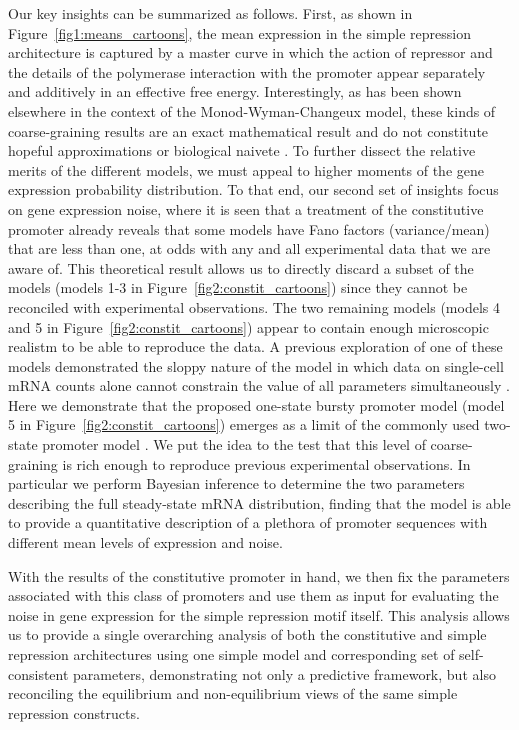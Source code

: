 Our key insights can be summarized as follows. First, as shown in 
Figure~\ref{fig1:means_cartoons}, the mean expression in the simple repression
architecture is captured by a master curve in which the action of repressor and
the details of the polymerase interaction with the promoter appear separately
and additively in an effective free energy. Interestingly, as has been shown
elsewhere in the context of the Monod-Wyman-Changeux model, these kinds of
coarse-graining results are an exact mathematical result and do not constitute
hopeful approximations or biological naivete \cite{Razo-Mejia2018, Chure2019}.
To further dissect the relative merits of the different models, we must appeal
to higher moments of the gene expression probability distribution. To that end,
our second set of insights focus on gene expression noise, where it is seen that
a treatment of the constitutive promoter already reveals that some models have
Fano factors (variance/mean) that are less than one, at odds with
any and all experimental data that we are aware of.
This theoretical result allows us to directly discard a subset of the models
(models 1-3 in Figure~\ref{fig2:constit_cartoons}) since they cannot be
reconciled with experimental observations. The two remaining models (models 4 and 5
in Figure~\ref{fig2:constit_cartoons}) appear to contain enough microscopic
realistm to be able to reproduce the data. A previous exploration of one 
of these models demonstrated the sloppy nature of the model in which data on single-cell
mRNA counts alone cannot constrain the value of all parameters 
simultaneously \cite{Razo-Mejia2020}. Here we demonstrate that the proposed
one-state bursty promoter model (model 5 in 
Figure~\ref{fig2:constit_cartoons}) emerges as  a limit of the commonly used
two-state promoter model \cite{Peccoud1995}. We put  the idea to the test that this
level of coarse-graining is rich enough to reproduce previous 
experimental observations. In particular we perform Bayesian inference to determine the
two parameters describing the full steady-state mRNA distribution, finding that
the model is able to provide a quantitative description of  a plethora of promoter sequences with different
mean levels of expression and noise.


With the results of the constitutive promoter in hand, we then fix the parameters
associated with this class of promoters and use them as input for evaluating
the noise in gene expression for the simple repression motif itself.  This analysis
allows us to provide a single overarching analysis of both the constitutive
and simple repression architectures using one simple model and
corresponding set of self-consistent parameters, demonstrating not only
a predictive framework, but also reconciling the equilibrium and non-equilibrium
views of the same simple repression constructs.

